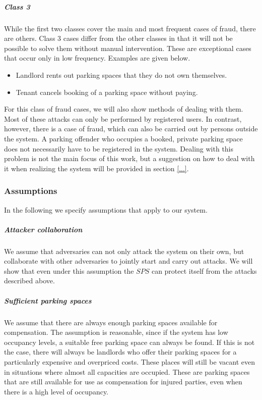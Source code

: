 \documentclass[
a4paper,     %
titlepage,   %
14pt         %
]{scrartcl}  %
\theoremstyle{mystyle}
\begin{document}
\subparagraph{Class 3} While the first two classes cover the main and most frequent cases of fraud, there are others. Class 3 cases differ from the other classes in that it will not be possible to solve them without manual intervention. These are exceptional cases that occur only in low frequency. Examples are given below.
\begin{itemize}
\item Landlord rents out parking spaces that they do not own themselves.
\item Tenant cancels booking of a parking space without paying.
\end{itemize}
For this class of fraud cases, we will also show methods of dealing with them.\\

Most of these attacks can only be performed by registered users. In contrast, however, there is a case of fraud, which can also be carried out by persons outside the system. A parking offender who occupies a booked, private parking space does not necessarily have to be registered in the system. Dealing with this problem is not the main focus of this work, but a suggestion on how to deal with it when realizing the system will be provided in section \ref{...}.

\subsubsection{Assumptions}
In the following we specify assumptions that apply to our system.\\

\subparagraph{Attacker collaboration} We assume that adversaries can not only attack the system on their own, but collaborate with other adversaries to jointly start and carry out attacks. We will show that even under this assumption the $SPS$ can protect itself from  the attacks described above.

\subparagraph{Sufficient parking spaces} We assume that there are always enough parking spaces available for compensation. The assumption is reasonable, since if the system has low occupancy levels, a suitable free parking space can always be found. If this is not the case, there will always be landlords  who offer their parking spaces for a particularly expensive and overpriced costs. These places will still be vacant even in situations where almost all capacities are occupied. These are parking spaces that are still available for use as compensation for injured parties, even when there is a high level of occupancy. 
\end{document}
